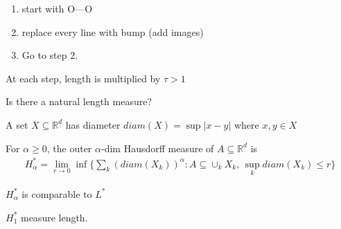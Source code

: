 \begin{example}
	\begin{enumerate}
		\item start with O---O
		\item replace every line with bump (add images)
		\item Go to step 2.
	\end{enumerate}
	At each step, length is multiplied by $\tau > 1$
\end{example}
Is there a natural length measure?

\begin{definition}
	A set $X \subseteq \mathbb{R}^d$ has diameter $diam(X) = \sup|x - y |$ where $x, y \in X$
\end{definition}

\begin{definition}
	For $\alpha \geq 0$, the outer $\alpha$-dim Hausdorff measure of $A \subseteq \mathbb{R}^d$ is
	\begin{align*}
		H_{\alpha}^* = \lim_{r \to 0} \inf\{ \sum_{k} \left(diam(X_{k}) \right)^{\alpha} : A \subseteq \cup_{k} X_k, \,
		\sup_{k} diam(X_k) \leq r \}
	\end{align*}

	$H_{\alpha}^*$ is comparable to $L^*$

	$H_{1}^*$ measure length.
\end{definition}

